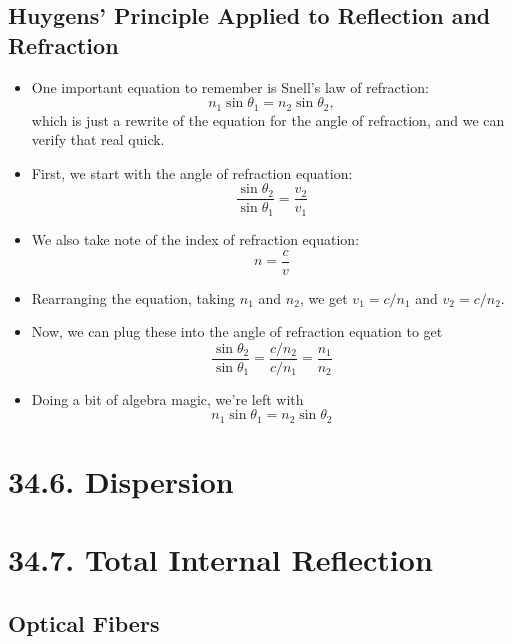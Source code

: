 \documentclass[12pt, letterpaper]{article}
\begin{document}
\subsection*{Huygens' Principle Applied to Reflection and Refraction}
\begin{itemize}
    \item One important equation to remember is Snell's law of refraction: \[n_{1}\sin{\theta_{1}}=n_{2}\sin{\theta_{2}},\] which is just a rewrite of the equation for the angle of refraction, and we can verify that real quick.
    \item First, we start with the angle of refraction equation: \[\frac{\sin{\theta_{2}}}{\sin{\theta_{1}}} = \frac{v_{2}}{v_{1}}\]
    \item We also take note of the index of refraction equation: \[n = \frac{c}{v}\] 
    \item Rearranging the equation, taking $n_{1}$ and $n_{2}$, we get $v_{1} = c/n_{1}$ and $v_{2} = c/n_{2}$.
    \item Now, we can plug these into the angle of refraction equation to get \[\frac{\sin{\theta_{2}}}{\sin{\theta_{1}}} = \frac{c/n_{2}}{c/n_{1}} = \frac{n_{1}}{n_{2}}\]
    \item Doing a bit of algebra magic, we're left with \[n_{1}\sin{\theta_{1}} = n_{2}\sin{\theta_{2}}\]
\end{itemize}

\section*{34.6. Dispersion}


\section*{34.7. Total Internal Reflection}

\subsection*{Optical Fibers}
\end{document}
